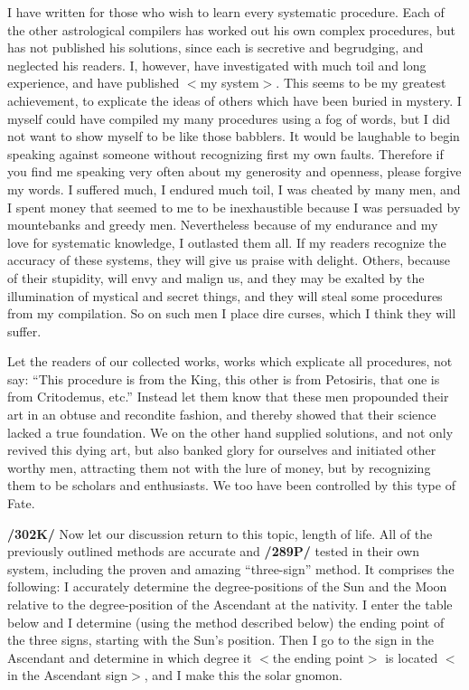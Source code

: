 I have written for those who wish to learn every systematic procedure. Each of the other astrological compilers has worked out his own complex procedures, but has not published his solutions, since each is
secretive and begrudging, and neglected his readers. I, however, have investigated with much toil and long experience, and have published $<$my system$>$. This seems to be my greatest achievement, to explicate the ideas of others which have been buried in mystery. I myself could have compiled my many procedures using a fog of words, but I did not want to show myself to be like those babblers. It would be laughable to begin speaking against someone without recognizing first my own faults. Therefore if you find me speaking very often about my generosity and openness, please forgive my words. I suffered much, I
endured much toil, I was cheated by many men, and I spent money that seemed to me to be inexhaustible because I was persuaded by mountebanks and greedy men. Nevertheless because of my endurance and my love for systematic knowledge, I outlasted them all. If my readers recognize the accuracy of these systems, they will give us praise with delight. Others, because of their stupidity, will envy and malign us, and they may be exalted by the illumination of mystical and secret things, and they will steal some procedures from my compilation. So on such men I place dire curses, which I think they will suffer.

Let the readers of our collected works, works which explicate all procedures, not say: “This procedure is from the King, this other is from Petosiris, that one is from Critodemus, etc.” Instead let them know
that these men propounded their art in an obtuse and recondite fashion, and thereby showed that their science lacked a true foundation. We on the other hand supplied solutions, and not only revived this dying art, but also banked glory for ourselves and initiated other worthy men, attracting them not with the lure of money, but by recognizing them to be scholars and enthusiasts. We too have been controlled by this type of Fate.

\textbf{/302K/} Now let our discussion return to this topic, length of life. All of the previously outlined methods are accurate and \textbf{/289P/} tested in their own system, including the proven and amazing “three-sign” method. It comprises the following: I accurately determine the degree-positions of the Sun and the Moon relative to the degree-position of the Ascendant at the nativity. I enter the table below and I determine (using the method described below) the ending point of the three signs, starting with the Sun’s position. Then I go to the sign in the Ascendant and determine in which degree it $<$the ending point$>$ is located $<$in the Ascendant sign$>$, and I make this the solar gnomon.


